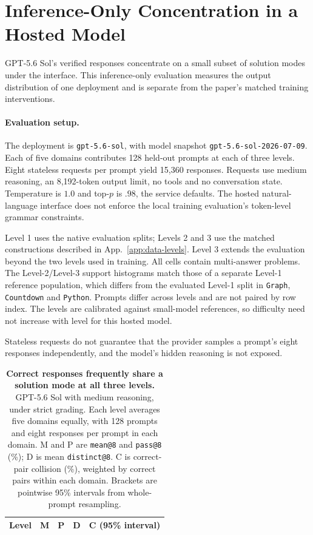 \section{Inference-Only Concentration in a Hosted Model}
\label{app:hosted-concentration}

GPT-5.6 Sol's verified responses concentrate on a small subset of solution
modes under the \mb{} interface. This inference-only evaluation measures the
output distribution of one deployment and is separate from the paper's matched
training interventions.

\paragraph{Evaluation setup.}
The deployment is \texttt{gpt-5.6-sol}, with model snapshot
\texttt{gpt-5.6-sol-2026-07-09}. Each of five domains contributes 128 held-out
prompts at each of three levels. Eight stateless requests per prompt yield
15,360 responses. Requests use medium reasoning, an 8,192-token output limit,
no tools and no conversation state. Temperature is $1.0$ and top-$p$ is $.98$,
the service defaults. The hosted natural-language interface does not enforce
the local training evaluation's token-level grammar constraints.

Level 1 uses the native evaluation splits; Levels 2 and 3 use the matched
constructions described in App.~\ref{app:data-levels}. Level 3 extends the
evaluation beyond the two levels used in training. All cells contain
multi-answer problems. The Level-2/Level-3 support histograms match those of a separate
Level-1 reference population, which differs from the evaluated Level-1 split
in \texttt{Graph}, \texttt{Countdown} and \texttt{Python}. Prompts differ across levels and are not
paired by row index. The levels are calibrated against small-model references,
so difficulty need not increase with level for this hosted model.

Stateless requests do not guarantee that the provider samples a prompt's eight
responses independently, and the model's hidden reasoning is not exposed.

\begin{table}[!htbp]
  \centering
  \caption{\textbf{Correct responses frequently share a solution mode at all three levels.}
  GPT-5.6 Sol with medium reasoning, under strict grading. Each level averages
  five domains equally, with 128 prompts and eight responses per prompt in
  each domain. M and P are \texttt{mean@8} and \texttt{pass@8} (\%); D is
  mean \texttt{distinct@8}. C is correct-pair collision (\%), weighted by
  correct pairs within each domain. Brackets are pointwise 95\% intervals
  from whole-prompt resampling.}
  \label{tab:hosted-levels}
  \small
  \begin{tabular}{@{}rrrrl@{}}
    \toprule
    Level & M & P & D & C (95\% interval) \\
    \midrule
    
  \end{tabular}
\end{table}

